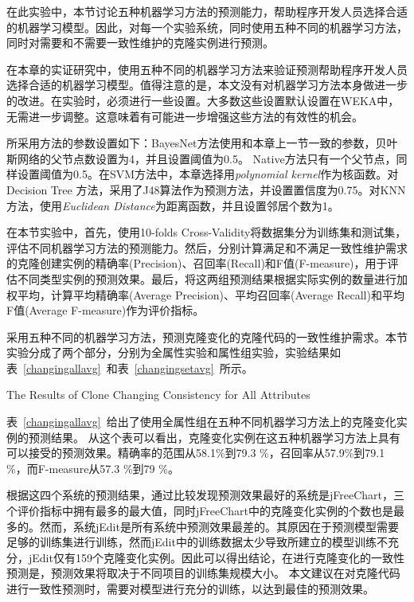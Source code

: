 在此实验中，本节讨论五种机器学习方法的预测能力，帮助程序开发人员选择合适的机器学习模型。因此，对每一个实验系统，同时使用五种不同的机器学习方法，同时对需要和不需要一致性维护的克隆实例进行预测。

在本章的实证研究中，使用五种不同的机器学习方法来验证预测帮助程序开发人员选择合适的机器学习模型。值得注意的是，本文没有对机器学习方法本身做进一步的改进。在实验时，必须进行一些设置。大多数这些设置默认设置在WEKA中，无需进一步调整。这意味着有可能进一步增强这些方法的有效性的机会。

所采用方法的参数设置如下：BayesNet方法使用和本章上一节一致的参数，贝叶斯网络的父节点数设置为4，并且设置阈值为0.5。 Native方法只有一个父节点，同样设置阈值为0.5。在SVM方法中，本章选择用{\em polynomial kernel\/}作为核函数。对Decision Tree 方法，采用了J48算法作为预测方法，并设置置信度为0.75。对KNN方法，使用{\em Euclidean Distance\/}为距离函数，并且设置邻居个数为1。

在本节实验中，首先，使用10-folds Cross-Validity将数据集分为训练集和测试集，评估不同机器学习方法的预测能力。然后，分别计算满足和不满足一致性维护需求的克隆创建实例的精确率(Precision)、召回率(Recall)和F值(F-measure)，用于评估不同类型实例的预测效果。最后，将这两组预测结果根据实际实例的数量进行加权平均，计算平均精确率(Average Precision)、平均召回率(Average Recall)和平均F值(Average F-measure)作为评价指标。

采用五种不同的机器学习方法，预测克隆变化的克隆代码的一致性维护需求。本节实验分成了两个部分，分别为全属性实验和属性组实验，实验结果如表~\ref{changingallavg}~和表~\ref{changingsetavg}~所示。

{The Results of Clone Changing Consistency for All Attributes}

表~\ref{changingallavg}~给出了使用全属性组在五种不同机器学习方法上的克隆变化实例的预测结果。
从这个表可以看出，克隆变化实例在这五种机器学习方法上具有可以接受的预测效果。精确率的范围从58.1\%到79.3 \%，召回率从57.9\%到79.1 \%，而F-measure从57.3 \%到79 \%。

根据这四个系统的预测结果，通过比较发现预测效果最好的系统是jFreeChart，三个评价指标中拥有最多的最大值，同时jFreeChart中的克隆变化实例的个数也是最多的。然而，系统jEdit是所有系统中预测效果最差的。其原因在于预测模型需要足够的训练集进行训练，然而jEdit中的训练数据太少导致所建立的模型训练不充分，jEdit仅有159个克隆变化实例。因此可以得出结论，在进行克隆变化的一致性预测是，预测效果将取决于不同项目的训练集规模大小。
本文建议在对克隆代码进行一致性预测时，需要对模型进行充分的训练，以达到最佳的预测效果。


